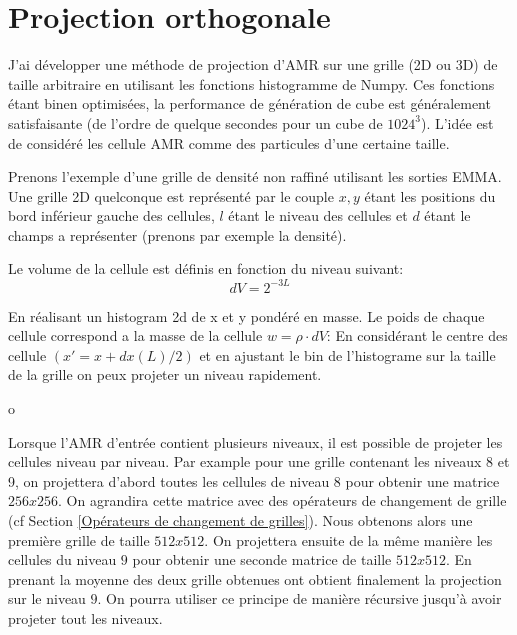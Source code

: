 \section{Projection orthogonale}

J'ai développer une méthode de projection d'AMR sur une grille (2D ou 3D) de taille arbitraire en utilisant les fonctions histogramme de Numpy.
Ces fonctions étant binen optimisées, la performance de génération de cube est généralement satisfaisante (de l'ordre de quelque secondes pour un cube de $1024^3$).
L'idée est de considéré les cellule AMR comme des particules d'une certaine taille.

Prenons l'exemple d'une grille de densité non raffiné utilisant les sorties EMMA.
Une grille 2D quelconque est représenté par le couple $x,y$ étant les positions du bord inférieur gauche des cellules, $l$ étant le niveau des cellules et $d$  étant le champs a représenter (prenons par exemple la densité).

Le volume de la cellule est définis en fonction du niveau suivant:
\begin{equation}
dV= 2^{-3L}
\end{equation} 


En réalisant un histogram 2d de x et y pondéré en masse.
Le poids de chaque cellule correspond a la masse de la cellule $w = \rho \cdot dV$:
En considérant le centre des cellule $(x' = x+dx(L) /2)$ et en ajustant le bin de l'histograme sur la taille de la grille on peux projeter un niveau rapidement.

o%


Lorsque l'AMR d'entrée contient plusieurs niveaux, il est possible de projeter les cellules niveau par niveau.
Par example pour une grille contenant les niveaux 8 et 9, on projettera d'abord toutes les cellules de niveau 8 pour obtenir une matrice $256x256$.
On agrandira cette matrice avec des opérateurs de changement de grille (cf Section \ref{Opérateurs de changement de grilles}).
Nous obtenons alors une première grille de taille $512x512$.
On projettera ensuite  de la même manière les cellules du niveau $9$ pour obtenir une seconde matrice de taille $512x512$.
En prenant la moyenne des deux grille obtenues ont obtient finalement la projection sur le niveau $9$.
On pourra utiliser ce principe de manière récursive jusqu'à avoir projeter tout les niveaux.

